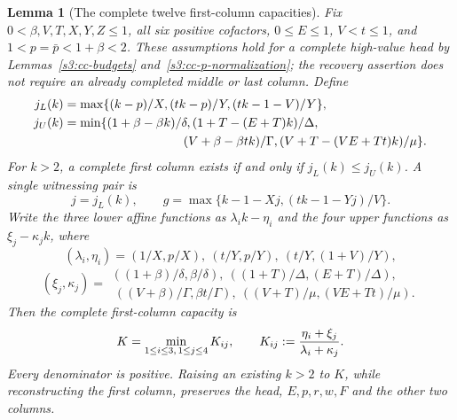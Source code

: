 \documentclass[11pt,reqno]{amsart}
\newtheorem{lemma}[theorem]{Lemma}
\theoremstyle{definition}
\theoremstyle{remark}
\begin{document}
\begin{lemma}[The complete twelve first-column capacities]
\label{s3:cc-twelve-capacities}
Fix \(0<\beta,V,T,X,Y,Z\le1\), all six positive cofactors,
\(0\le E\le1\), \(V<t\le1\), and
\(1<p=\bar p<1+\beta<2\). These assumptions hold for a
complete high-value head by Lemmas~\ref{s3:cc-budgets}
and~\ref{s3:cc-p-normalization}; the recovery assertion does not
require an already completed middle or last column. Define
\begin{align*}
 j_L(k)&=\max\{(k-p)/X,(tk-p)/Y,(tk-1-V)/Y\},\\
 j_U(k)&=\min\{(1+\beta-\beta k)/\delta,
       (1+T-(E+T)k)/\Delta,\\
 &\hspace{34mm}(V+\beta-\beta tk)/\Gamma,
       (V+T-(VE+Tt)k)/\mu\}.
\end{align*}
For \(k>2\), a complete first column exists if and only if
\(j_L(k)\le j_U(k)\). A single witnessing pair is
\begin{equation}\label{s3:cc-first-recovery}
 j=j_L(k),\qquad
 g=\max\{k-1-Xj,(tk-1-Yj)/V\}.
\end{equation}
Write the three lower affine functions as \(\lambda_i k-\eta_i\)
and the four upper functions as \(\xi_j-\kappa_j k\), where
\[
 (\lambda_i,\eta_i)=
 (1/X,p/X),\ (t/Y,p/Y),\ (t/Y,(1+V)/Y),
\]
\[
 (\xi_j,\kappa_j)=\begin{gathered}
 ((1+\beta)/\delta,\beta/\delta),\
  ((1+T)/\Delta,(E+T)/\Delta),\\
 \
 ((V+\beta)/\Gamma,\beta t/\Gamma),\
 ((V+T)/\mu,(VE+Tt)/\mu).\end{gathered}
\]
Then the complete first-column capacity is
\begin{equation}\label{s3:cc-twelve-K}
 K=\min_{1\le i\le3,\,1\le j\le4}K_{ij},\qquad
 K_{ij}:={\eta_i+\xi_j\over\lambda_i+\kappa_j}.
\end{equation}
Every denominator is positive. Raising an existing \(k>2\) to
\(K\), while reconstructing the first column, preserves the
head, \(E,p,r,w,F\) and the other two columns.
\end{lemma}
\end{document}

